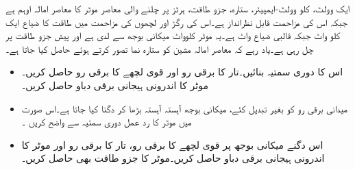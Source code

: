 %
ایک  وولٹ،  کلو وولٹ-ایمپیئر، ستارہ،  جزو طاقت،  ہرٹز پر چلنے والی معاصر موٹر کا معاصر امالہ  اوہم  ہے جبکہ اس کی مزاحمت قابل نظرانداز ہے۔اس کی رگڑ اور لچھوں کی مزاحمت میں طاقت کا ضیاع ایک کلو واٹ جبکہ قالبی ضیاع  واٹ ہے۔یہ موٹر   کلوواٹ میکانی بوجھ سے لدی  ہے اور    پیش جزو طاقت   پر چل رہی ہے۔یاد رہے کہ معاصر امالہ مشین کو ستارہ نما تصور کرتے ہوئے حاصل کیا جاتا ہے۔ 
\begin{itemize}
\item
اس کا دوری سمتیہ بنائیں۔تار کا برقی رو  اور قوی لچھے کا برقی رو   حاصل کریں۔موٹر کا اندرونی ہیجانی برقی دباو  حاصل کریں۔
\item
میدانی برقی رو کو بغیر تبدیل کئے،  میکانی بوجھ آہستہ آہستہ بڑھا کر دگنا کیا جاتا ہے۔اس صورت میں موٹر کا رد عمل دوری سمتیہ سے واضح کریں ۔
\item
اس دگنے میکانی بوجھ پر قوی لچھے  کا برقی رو،  تار کا برقی رو  اور موٹر کا اندرونی ہیجانی برقی دباو حاصل کریں۔موٹر کا جزو طاقت بھی حاصل کریں۔
\end{itemize}

